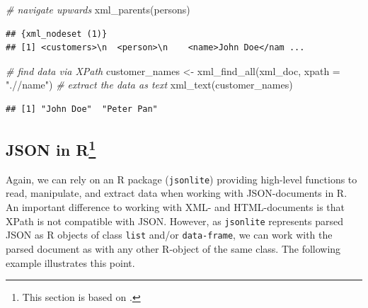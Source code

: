 \documentclass[
  12pt,
]{style/krantz}
\newenvironment{Shaded}{\begin{snugshade}}{\end{snugshade}}
\newcommand{\AttributeTok}[1]{\textcolor[rgb]{0.77,0.63,0.00}{#1}}
\newcommand{\CommentTok}[1]{\textcolor[rgb]{0.56,0.35,0.01}{\textit{#1}}}
\newcommand{\FunctionTok}[1]{\textcolor[rgb]{0.00,0.00,0.00}{#1}}
\newcommand{\NormalTok}[1]{#1}
\newcommand{\OtherTok}[1]{\textcolor[rgb]{0.56,0.35,0.01}{#1}}
\newcommand{\SpecialCharTok}[1]{\textcolor[rgb]{0.00,0.00,0.00}{#1}}
\newcommand{\StringTok}[1]{\textcolor[rgb]{0.31,0.60,0.02}{#1}}
\begin{document}
\begin{Shaded}
\begin{Highlighting}[]
\CommentTok{\# navigate upwards}
\FunctionTok{xml\_parents}\NormalTok{(persons)}
\end{Highlighting}
\end{Shaded}

\begin{verbatim}
## {xml_nodeset (1)}
## [1] <customers>\n  <person>\n    <name>John Doe</nam ...
\end{verbatim}

\begin{Shaded}
\begin{Highlighting}[]
\CommentTok{\# find data via XPath}
\NormalTok{customer\_names }\OtherTok{\textless{}{-}} \FunctionTok{xml\_find\_all}\NormalTok{(xml\_doc, }\AttributeTok{xpath =} \StringTok{".//name"}\NormalTok{)}
\CommentTok{\# extract the data as text}
\FunctionTok{xml\_text}\NormalTok{(customer\_names)}
\end{Highlighting}
\end{Shaded}

\begin{verbatim}
## [1] "John Doe"  "Peter Pan"
\end{verbatim}

\hypertarget{json-in-r}{%
\subsection[JSON in R]{\texorpdfstring{JSON in R\footnote{This section is based on \citet{umatter_2018b}.}}{JSON in R}}\label{json-in-r}}

Again, we can rely on an R package (\texttt{jsonlite}) providing high-level functions to read, manipulate, and extract data when working with JSON-documents in R. An important difference to working with XML- and HTML-documents is that XPath is not compatible with JSON. However, as \texttt{jsonlite} represents parsed JSON as R objects of class \texttt{list} and/or \texttt{data-frame}, we can work with the parsed document as with any other R-object of the same class. The following example illustrates this point.

\begin{Shaded}
\end{Shaded}
\end{document}
